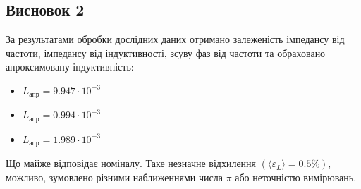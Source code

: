 \documentclass[a4paper,12pt]{article}
\begin{document}
\begin{justify}
\subsection*{Висновок 2}
За результатами обробки дослідних даних отримано залеженість імпедансу від частоти, імпедансу від індуктивності, зсуву фаз від частоти та обраховано апроксимовану індуктивність:
\begin{itemize}
		\item $L_{\textrm{апр}}=9.947\cdot10^{-3}$
		\item $L_{\textrm{апр}}=0.994\cdot10^{-3}$
		\item $L_{\textrm{апр}}=1.989\cdot10^{-3}$
	\end{itemize}
Що майже відповідає номіналу. Таке незначне відхилення $(\langle\varepsilon_L\rangle=0.5\%)$, можливо, зумовлено різними наближеннями числа $\pi$ або неточністю вимірювань.\newpage
    
    
    
    
    
    
    
    
    
    
    
    
    
    
    
    
    
    
    
    
    
    
    
    
    
    
    
    
    
    
    
\end{justify}
\end{document}
